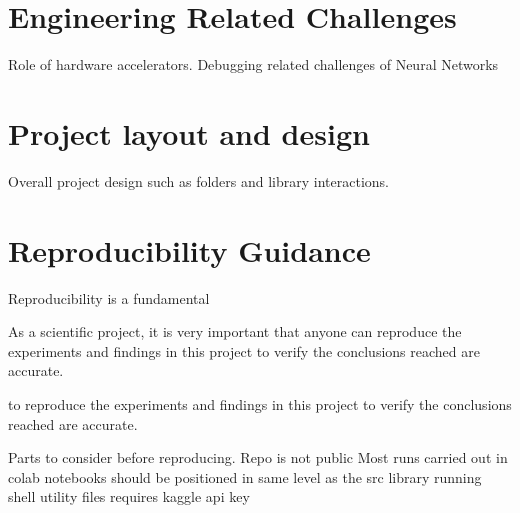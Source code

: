 \section{Engineering Related Challenges}
Role of hardware accelerators. Debugging related challenges of Neural Networks

\section{Project layout and design}
Overall project design such as folders and library interactions.

\section{Reproducibility Guidance}
Reproducibility is a fundamental 

As a scientific project, it is very important that anyone can reproduce the experiments and findings in this project to verify the conclusions reached are accurate. \cite{dataset}


to reproduce the experiments and findings in this project to verify the conclusions reached are accurate.

Parts to consider before reproducing.
Repo is not public
Most runs carried out in colab 
notebooks should be positioned in same level as the src library
running shell utility files requires kaggle api key


\clearpage